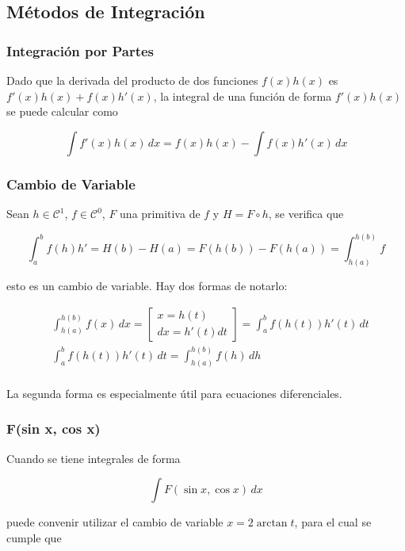 \subsection{Métodos de Integración}

\subsubsection{Integración por Partes}

Dado que la derivada del producto de dos funciones $f(x)h(x)$ es $f'(x)h(x)+f(x)h'(x)$, la integral de una función de forma $f'(x)h(x)$ se puede calcular como

\[\int f'(x)h(x)\,dx = f(x)h(x) - \int f(x)h'(x)\,dx\]

\subsubsection{Cambio de Variable}

Sean $h \in \mathcal{C}^1$, $f\in\mathcal{C}^0$, $F$ una primitiva de $f$ y $H = F \circ h$, se verifica que

\[\int^b_af(h)h'=H(b)-H(a)=F(h(b))-F(h(a))=\int^{h(b)}_{h(a)}f\]

esto es un cambio de variable. Hay dos formas de notarlo:

\begin{equation}
\begin{split}
    &\int^{h(b)}_{h(a)}f(x)\,dx =
    \begin{bmatrix}
    x = h(t)\\
    dx= h'(t)dt
    \end{bmatrix} = \int^b_af(h(t))h'(t)\,dt\\
    &\int^b_af(h(t))h'(t)\,dt = \int^{h(b)}_{h(a)} f(h)\,dh\\
\end{split}
\nonumber
\end{equation}

La segunda forma es especialmente útil para ecuaciones diferenciales.

\subsubsection{F(sin x, cos x)}

Cuando se tiene integrales de forma

\[\int F(\sin{x}, \cos{x})\,dx\]

puede convenir utilizar el cambio de variable $x = 2\arctan{t}$, para el cual se cumple que

